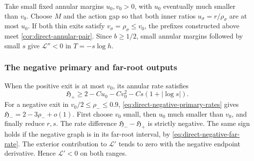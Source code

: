 Take small fixed annular margins \(u_0,v_0>0\),
with \(u_0\) eventually much smaller than \(v_0\).
Choose \(M\) and the action gap so that both inner ratios
\(u_\sigma=r/\rho_\sigma\) are at most \(u_0\).
If both thin exits satisfy \(v_\sigma=\rho_\sigma\le v_0\), the prefixes
constructed above meet \cref{cor:direct-annular-pair}. Since \(b\ge1/2\),
small annular margins followed by small \(s\) give \(\mathcal L''<0\)
in \(T=-s\log h\).

\subsubsection{The negative primary and far-root outputs}

When the positive exit is at most \(v_0\), its annular
rate satisfies
\[
 \mathfrak H_+\ge
       2-Cu_0-Cv_0^2-Cs(1+|\log s|).
\]
For a negative exit in \(v_0/2\le\rho_-\le0.9\),
\eqref{eq:direct-negative-primary-rates} gives
\(\mathfrak H_-=2-3\rho_-+o(1)\).
First choose \(v_0\) small, then \(u_0\) much smaller
than \(v_0\), and finally reduce \(r,s\).
The rate difference \(\mathfrak H_--\mathfrak H_+\) is strictly negative.
The same sign
holds if the negative graph is in its far-root interval,
by \eqref{eq:direct-negative-far-rate}.
The exterior contribution to \(\mathcal L'\) tends to
zero with the negative endpoint derivative.
Hence \(\mathcal L'<0\) on both ranges.

